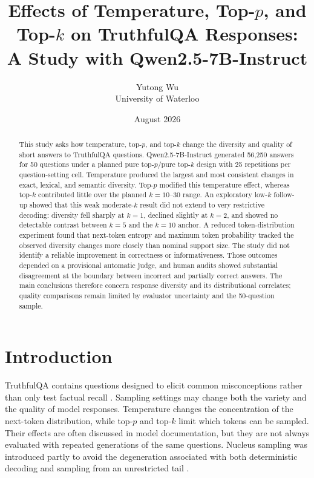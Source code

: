 \documentclass[11pt]{article}
\title{Effects of Temperature, Top-$p$, and Top-$k$ on TruthfulQA Responses:\\
A Study with Qwen2.5-7B-Instruct}
\author{Yutong Wu\\University of Waterloo}
\date{August 2026}
\begin{document}
\maketitle

\begin{abstract}
This study asks how temperature, top-$p$, and top-$k$ change the diversity and
quality of short answers to TruthfulQA questions. Qwen2.5-7B-Instruct generated
56,250 answers for 50 questions under a planned pure top-$p$/pure top-$k$
design with 25 repetitions per question-setting cell. Temperature produced the
largest and most consistent changes in exact, lexical, and semantic diversity.
Top-$p$ modified this temperature effect, whereas top-$k$ contributed little
over the planned $k=10$--30 range. An exploratory low-$k$ follow-up showed that
this weak moderate-$k$ result did not extend to very restrictive decoding:
diversity fell sharply at $k=1$, declined slightly at $k=2$, and showed no
detectable contrast between $k=5$ and the $k=10$ anchor. A reduced
token-distribution experiment found that next-token entropy and maximum token
probability tracked the observed diversity changes more closely than nominal
support size. The study did not identify a reliable improvement in correctness
or informativeness. Those outcomes depended on a provisional automatic judge,
and human audits showed substantial disagreement at the boundary between
incorrect and partially correct answers. The main conclusions therefore concern
response diversity and its distributional correlates; quality comparisons
remain limited by evaluator uncertainty and the 50-question sample.
\end{abstract}

\section{Introduction}

TruthfulQA contains questions designed to elicit common misconceptions rather
than only test factual recall \cite{lin2022truthfulqa}. Sampling settings may
change both the variety and the quality of model responses. Temperature changes
the concentration of the next-token distribution, while top-$p$ and top-$k$
limit which tokens can be sampled. Their effects are often discussed in model
documentation, but they are not always evaluated with repeated generations of
the same questions. Nucleus sampling was introduced partly to avoid the
degeneration associated with both deterministic decoding and sampling from an
unrestricted tail \cite{holtzman2020degeneration}.
\end{document}
